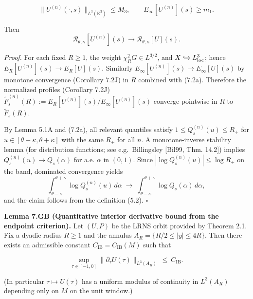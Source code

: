 \documentclass[
  11pt,
]{article}
\begin{document}
\begin{equation}
\|U^{(n)}(\cdot,s)\|_{L^3(\mathbb R^3)}\le M_3,
\qquad
E_\infty[U^{(n)}](s)\ge m_1.
\tag{7.2a}
\end{equation}

Then \[
\mathcal R_{\theta,\kappa}[U^{(n)}](s)\to \mathcal R_{\theta,\kappa}[U](s).
\]

\emph{Proof.} For each fixed \(R\ge 1\), the weight \(\chi_R^2G\in L^{3/2}\), and \(X\hookrightarrow L^3_{\rm loc}\); hence \(E_R[U^{(n)}](s)\to E_R[U](s)\). Similarly \(E_\infty[U^{(n)}](s)\to E_\infty[U](s)\) by monotone convergence (Corollary 7.2J) in \(R\) combined with (7.2a). Therefore the normalized profiles (Corollary 7.2J) \(\widetilde F^{(n)}_s(R):=E_R[U^{(n)}](s)/E_\infty[U^{(n)}](s)\) converge pointwise in \(R\) to \(\widetilde F_s(R)\).

By Lemma 5.1A and (7.2a), all relevant quantiles satisfy \(1\le Q^{(n)}_s(u)\le R_+\) for \(u\in[\theta-\kappa,\theta+\kappa]\) with the same \(R_+\) for all \(n\). A monotone-inverse stability lemma (for distribution functions; see e.g.~Billingsley {[}Bil99, Thm. 14.2{]}) implies \(Q^{(n)}_s(u)\to Q_s(\alpha)\) for a.e. \(\alpha\) in \((0,1)\). Since \(|\log Q^{(n)}_s(u)|\le \log R_+\) on the band, dominated convergence yields \[
\int_{\theta-\kappa}^{\theta+\kappa}\log Q^{(n)}_s(u)\,d\alpha
\;\to\;
\int_{\theta-\kappa}^{\theta+\kappa}\log Q_s(\alpha)\,d\alpha,
\] and the claim follows from the definition (5.2). \(\square\)

\textbf{Lemma 7.GB (Quantitative interior derivative bound from the endpoint criterion).} Let \((U,P)\) be the LRNS orbit provided by Theorem 2.1. Fix a dyadic radius \(R\ge 1\) and the annulus \(A_R=\{R/2\le |y|\le 4R\}\). Then there exists an admissible constant \(C_{\mathrm{IB}}=C_{\mathrm{IB}}(M)\) such that

\begin{equation}
\sup_{\tau\in[-1,0]}\|\partial_\tau U(\tau)\|_{L^3(A_R)}\ \le\ C_{\mathrm{IB}}.
\tag{7.GB}\label{eq:IB_dtaU_L3}
\end{equation}

(In particular \(\tau\mapsto U(\tau)\) has a uniform modulus of continuity in \(L^3(A_R)\) depending only on \(M\) on the unit window.)
\end{document}
